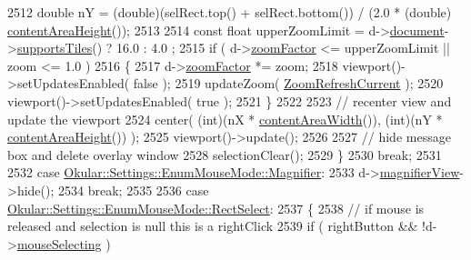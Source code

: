 \begin{DoxyCode}
2512                 \textcolor{keywordtype}{double} nY = (double)(selRect.top() + selRect.bottom()) / (2.0 * (\textcolor{keywordtype}{double})
      \hyperlink{classPageView_a470bc494311a2741be6b84fca1bed847}{contentAreaHeight}());
2513 
2514                 \textcolor{keyword}{const} \textcolor{keywordtype}{float} upperZoomLimit = d->\hyperlink{classPageViewPrivate_a50645b9853306cffd74e51efb677e5b4}{document}->\hyperlink{classOkular_1_1Document_a195dd7b2d52ecaf17541a437d5f9e579}{supportsTiles}() ? 16.0 : 4.0
      ;
2515                 \textcolor{keywordflow}{if} ( d->\hyperlink{classPageViewPrivate_a938411ef880f839b765aeac48a482b9e}{zoomFactor} <= upperZoomLimit || zoom <= 1.0 )
2516                 \{
2517                     d->\hyperlink{classPageViewPrivate_a938411ef880f839b765aeac48a482b9e}{zoomFactor} *= zoom;
2518                     viewport()->setUpdatesEnabled( \textcolor{keyword}{false} );
2519                     updateZoom( \hyperlink{classPageView_af489dc2492677bb4f422660627f62aecab9583485dc9e9287fc1fc02392c5a47b}{ZoomRefreshCurrent} );
2520                     viewport()->setUpdatesEnabled( \textcolor{keyword}{true} );
2521                 \}
2522 
2523                 \textcolor{comment}{// recenter view and update the viewport}
2524                 center( (\textcolor{keywordtype}{int})(nX * \hyperlink{classPageView_acaead56a0e9efe0ad73e8c532fa9f160}{contentAreaWidth}()), (\textcolor{keywordtype}{int})(nY * 
      \hyperlink{classPageView_a470bc494311a2741be6b84fca1bed847}{contentAreaHeight}()) );
2525                 viewport()->update();
2526 
2527                 \textcolor{comment}{// hide message box and delete overlay window}
2528                 selectionClear();
2529             \}
2530             \textcolor{keywordflow}{break};
2531 
2532         \textcolor{keywordflow}{case} \hyperlink{classOkular_1_1Settings_1_1EnumMouseMode_ab2ae04e2d7d069f02195ccf32c52415bab95111677f0c566414f48ece94ce0f45}{Okular::Settings::EnumMouseMode::Magnifier}:
2533             d->\hyperlink{classPageViewPrivate_aee1dfa250e17ccbf107395f2fe733958}{magnifierView}->hide();
2534             \textcolor{keywordflow}{break};
2535 
2536         \textcolor{keywordflow}{case} \hyperlink{classOkular_1_1Settings_1_1EnumMouseMode_ab2ae04e2d7d069f02195ccf32c52415baa9bf3100d0e93abfec2769957743e6a2}{Okular::Settings::EnumMouseMode::RectSelect}:
2537         \{
2538             \textcolor{comment}{// if mouse is released and selection is null this is a rightClick}
2539             \textcolor{keywordflow}{if} ( rightButton && !d->\hyperlink{classPageViewPrivate_a8819b152a8279b75359af2a3e0567681}{mouseSelecting} )

\end{DoxyCode}

